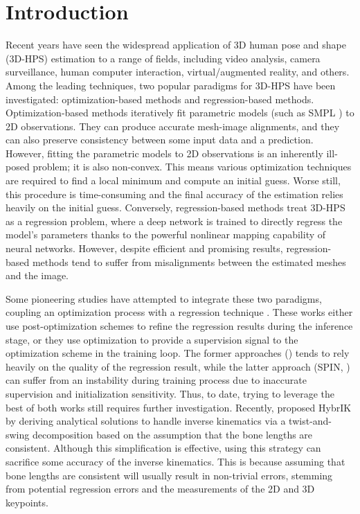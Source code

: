 \documentclass[letterpaper]{article} \usepackage{aaai23}  \usepackage{times}  \usepackage{helvet}  \usepackage{courier}  \usepackage[hyphens]{url}  \usepackage{graphicx} \urlstyle{rm} \def\UrlFont{\rm}  \usepackage{natbib}  \usepackage{caption} \frenchspacing  \setlength{\pdfpagewidth}{8.5in}  \setlength{\pdfpageheight}{11in}  \usepackage{algorithm}
\begin{document}
\section{Introduction}
Recent years have seen the widespread application of 3D human pose and shape (3D-HPS) estimation to a range of fields, including video analysis, camera surveillance, human computer interaction, virtual/augmented reality, and others. Among the leading techniques, two popular paradigms for 3D-HPS have been investigated: optimization-based methods and regression-based methods. Optimization-based methods \cite{bogo2016keep, fan2021revitalizing} iteratively fit parametric models (such as SMPL \cite{loper2015smpl}) to 2D observations. They can produce accurate mesh-image alignments, and they can also preserve consistency between some input data and a prediction. However, fitting the parametric models to 2D observations is an inherently ill-posed problem; it is also non-convex. This means various optimization techniques are required to find a local minimum and compute an initial guess. Worse still, this procedure is time-consuming and the final accuracy of the estimation relies heavily on the initial guess. Conversely, regression-based methods treat 3D-HPS as a regression problem, where a deep network is trained to directly regress the model’s parameters thanks to the powerful nonlinear mapping capability of neural networks. However, despite efficient and promising results, regression-based methods tend to suffer from misalignments between the estimated meshes and the image. 

Some pioneering studies have attempted to integrate these two paradigms, coupling an optimization process with a regression technique  \cite{zanfir2021neural,guler2019holopose,kolotouros2019learning}. These works either use post-optimization schemes to refine the regression results during the inference stage, or they use optimization to provide a supervision signal to the optimization scheme in the training loop. The former approaches (\cite{zanfir2021neural,guler2019holopose}) tends to rely heavily on the quality of the regression result, while the latter approach (SPIN, \cite{kolotouros2019learning}) can suffer from an instability during training process due to inaccurate supervision and initialization sensitivity. Thus, to date, trying to leverage the best of both works still requires further investigation. Recently, \cite{li2021hybrik} proposed HybrIK by deriving analytical solutions to handle inverse kinematics via a twist-and-swing decomposition based on the assumption that the bone lengths are consistent. Although this simplification is effective, using this strategy can sacrifice some accuracy of the inverse kinematics. This is because assuming that bone lengths are consistent will usually result in non-trivial errors, stemming from potential regression errors and the measurements of the 2D and 3D keypoints. 
\end{document}
